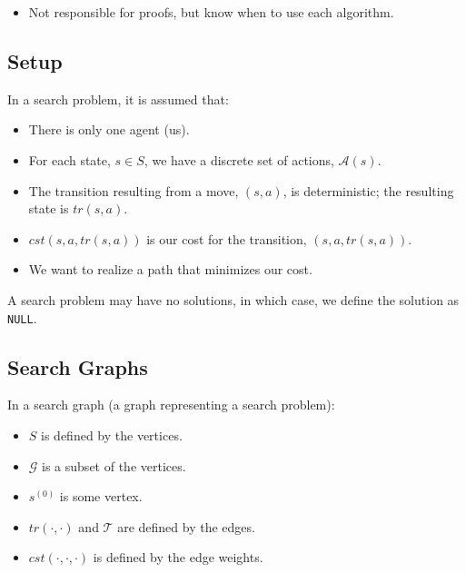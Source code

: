 \begin{summary}
    \begin{itemize}
        \item Not responsible for proofs, but know when to use each algorithm.
    \end{itemize}
\end{summary}
\subsection{Setup}
\begin{definition} In a search problem, it is assumed that: 
    \begin{itemize}
        \item There is only one agent (us).
        \item For each state, $s \in S$, we have a discrete set of actions, $\mathcal{A}(s)$.
        \item The transition resulting from a move, $(s, a)$, is deterministic; the resulting state is $tr(s, a)$.
        \item $cst(s, a, tr(s, a))$ is our cost for the transition, $(s, a, tr(s, a))$.
        \item We want to realize a path that minimizes our cost.
    \end{itemize}
    
    A search problem may have no solutions, in which case, we define the solution as \texttt{NULL}.
\end{definition}

\subsection{Search Graphs}
\begin{definition}
    In a search graph (a graph representing a search problem):
    \begin{itemize}
        \item $S$ is defined by the vertices.
        \item $\mathcal{G}$ is a subset of the vertices.
        \item $s^{(0)}$ is some vertex.
        \item $tr(\cdot, \cdot)$ and $\mathcal{T}$ are defined by the edges.
        \item $cst(\cdot, \cdot, \cdot)$ is defined by the edge weights.
    \end{itemize}
\end{definition}

